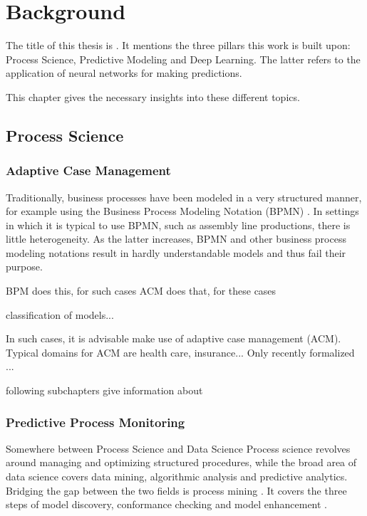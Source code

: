 \chapter{Background}\label{chap:background}
The title of this thesis is \textit{\thesisTitle}. It mentions the three pillars this work is built upon: Process Science, Predictive Modeling and Deep Learning. The latter refers to the application of neural networks for making predictions.

This chapter gives the necessary insights into these different topics.

\section{Process Science}
\subsection{Adaptive Case Management}
Traditionally, business processes have been modeled in a very structured manner, for example using the Business Process Modeling Notation (BPMN) \cite{bpmn2.0}.
In settings in which it is typical to use BPMN, such as assembly line productions, there is little heterogeneity.
As the latter increases, BPMN and other business process modeling notations result in hardly understandable models and thus fail their purpose.

BPM does this, for such cases
ACM does that, for these cases

classification of models...

In such cases, it is advisable make use of adaptive case management (ACM). Typical domains for ACM are health care, insurance...
Only recently formalized \cite{hewelt2016}...

following subchapters give information about

\subsection{Predictive Process Monitoring}
Somewhere between Process Science and Data Science
Process science revolves around managing and optimizing structured procedures, while the broad area of data science covers data mining, algorithmic analysis and predictive analytics. 
Bridging the gap between the two fields is process mining \cite[p.18]{Aalst16}.
It covers the three steps of model discovery, conformance checking and model enhancement \cite{Aalst16}.

